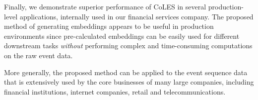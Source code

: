 \documentclass[sigconf, anonymous]{acmart}
\begin{document}
Finally, we demonstrate superior performance of CoLES in several production-level
applications, internally used in our financial services company.
% 
The proposed method of generating embeddings appears to be useful in production environments
since pre-calculated embeddings can be easily used for different downstream tasks \emph{without}
performing complex and time-consuming computations on the raw event data.

More generally, the proposed method can be applied to the event sequence data that is extensively
used by the core businesses of many large companies, including financial institutions, internet
companies, retail and telecommunications.

\end{document}
